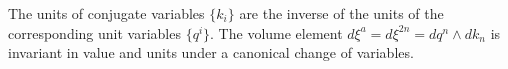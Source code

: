 \documentclass{article}
\begin{document}
	
	
	
\begin{prop}
	The units of conjugate variables $\{k_i\}$ are the inverse of the units of the corresponding unit variables $\{q^i\}$. The volume element $d\xi^a = d\xi^{2n} = dq^n \land dk_n$ is invariant in value and units under a canonical change of variables.
\end{prop}
\end{document}
